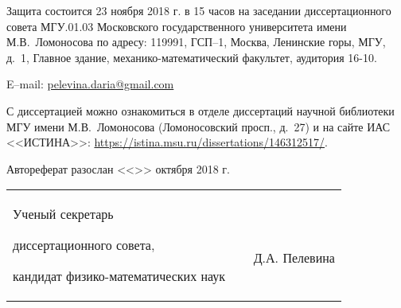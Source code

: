 \documentclass[a4paper,14pt,
oneside]{extbook}
\begin{document}
Защита состоится 23 ноября 2018 г. в 15 часов на
заседании диссертационного совета МГУ.01.03 Московского
государственного университета имени М.В.~Ломоносова по адресу:
119991, ГСП--1, Москва, Ленинские горы, МГУ, д.~1, Главное здание, механико-математический
факультет, аудитория 16-10.

\vsp

E--mail: \href{pelevina.daria@gmail.com}{pelevina.daria@gmail.com}

\vsp

С диссертацией можно ознакомиться в отделе диссертаций научной библиотеки МГУ имени М.В.~Ломоносова (Ломоносовский просп., д.~27) и на сайте ИАС <<ИСТИНА>>: \url{https://istina.msu.ru/dissertations/146312517/}.

\vsp

Автореферат разослан <<\underline{\hspace{1.0cm}}>> октября 2018 г.

\vsp

\vfill

\noindent\begin{tabular}{@{}p{10cm}@{}p{4cm}@{}p{3.5cm}@{}}
Ученый секретарь

диссертационного совета,

кандидат физико-математических наук
 &
$\:$

 &
$\:$

$\:$

\raggedleft  Д.А. Пелевина\\
\end{tabular}

\newpage




\end{document}
